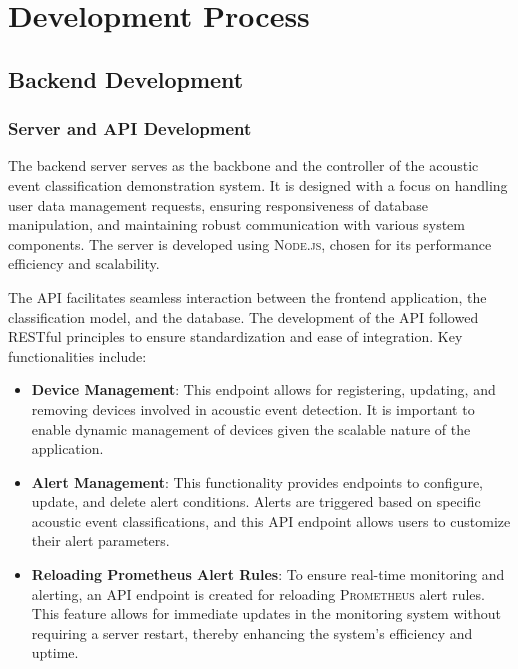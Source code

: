 \section{Development Process}

\subsection{Backend Development}
\subsubsection{Server and API Development}

The backend server serves as the backbone and the controller of the acoustic event classification demonstration system. It is designed with a focus on handling user data management requests, ensuring responsiveness of database manipulation, and maintaining robust communication with various system components. The server is developed using \textsc{Node.js}, chosen for its performance efficiency and scalability.

The API facilitates seamless interaction between the frontend application, the classification model, and the database. The development of the API followed RESTful principles to ensure standardization and ease of integration. Key functionalities include:

\begin{itemize}
  \item \textbf{Device Management}: This endpoint allows for registering, updating, and removing devices involved in acoustic event detection. It is important to enable dynamic management of devices given the scalable nature of the application.
  \item \textbf{Alert Management}: This functionality provides endpoints to configure, update, and delete alert conditions. Alerts are triggered based on specific acoustic event classifications, and this API endpoint allows users to customize their alert parameters.
  \item \textbf{Reloading Prometheus Alert Rules}: To ensure real-time monitoring and alerting, an API endpoint is created for reloading \textsc{Prometheus} alert rules. This feature allows for immediate updates in the monitoring system without requiring a server restart, thereby enhancing the system’s efficiency and uptime.
\end{itemize}

